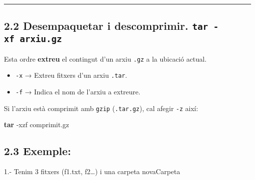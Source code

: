 \documentclass[
  12 pt,
  a4paper,
]{article}
\newenvironment{Shaded}{\begin{snugshade}}{\end{snugshade}}
\newcommand{\AttributeTok}[1]{\textcolor[rgb]{0.13,0.29,0.53}{#1}}
\newcommand{\ExtensionTok}[1]{#1}
\newcommand{\FunctionTok}[1]{\textcolor[rgb]{0.13,0.29,0.53}{\textbf{#1}}}
\newcommand{\NormalTok}[1]{#1}
\providecommand{\tightlist}{%
  \setlength{\itemsep}{0pt}\setlength{\parskip}{0pt}}
\begin{document}
\begin{center}\rule{0.5\linewidth}{0.5pt}\end{center}

\subsection{\texorpdfstring{2.2 Desempaquetar i descomprimir.
\texttt{tar\ -xf\ arxiu.gz}}{2.2 Desempaquetar i descomprimir. tar -xf arxiu.gz}}\label{desempaquetar-i-descomprimir.-tar--xf-arxiu.gz}

Esta ordre \textbf{extreu} el contingut d'un arxiu \texttt{.gz} a la
ubicació actual.

\begin{itemize}
\tightlist
\item
  \texttt{-x} → Extreu fitxers d'un arxiu \texttt{.tar}.\\
\item
  \texttt{-f} → Indica el nom de l'arxiu a extreure.
\end{itemize}

Si l'arxiu està comprimit amb \texttt{gzip} (\texttt{.tar.gz}), cal
afegir \texttt{-z} així:

\begin{Shaded}
\begin{Highlighting}[]
\FunctionTok{tar} \AttributeTok{{-}xzf}\NormalTok{ comprimit.gz }
\end{Highlighting}
\end{Shaded}

\subsection{2.3 Exemple:}\label{exemple}

1.- Tenim 3 fitxers (f1.txt, f2\ldots) i una carpeta novaCarpeta

\begin{Shaded}
\end{Shaded}
\end{document}
